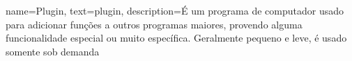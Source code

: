 
{
  name=Plugin,
  text=plugin,
  description={É um programa de computador usado para adicionar funções a outros programas maiores, provendo alguma funcionalidade especial ou muito específica. Geralmente pequeno e leve, é usado somente sob demanda}
}
